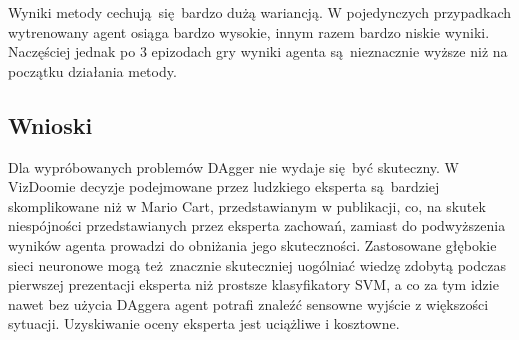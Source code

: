 Wyniki metody cechują się bardzo dużą wariancją. W pojedynczych przypadkach wytrenowany agent osiąga bardzo wysokie, innym razem bardzo niskie wyniki. Naczęściej jednak po 3 epizodach gry wyniki agenta są nieznacznie wyższe niż na początku działania metody.

\subsection{Wnioski}
Dla wypróbowanych problemów DAgger nie wydaje się być skuteczny. W VizDoomie decyzje podejmowane przez ludzkiego eksperta są bardziej skomplikowane niż w Mario Cart, przedstawianym w publikacji, co, na skutek niespójności przedstawianych przez eksperta zachowań, zamiast do podwyższenia wyników agenta prowadzi do obniżania jego skuteczności. Zastosowane głębokie sieci neuronowe mogą też znacznie skuteczniej uogólniać wiedzę zdobytą podczas pierwszej prezentacji eksperta niż prostsze klasyfikatory SVM, a co za tym idzie nawet bez użycia DAggera agent potrafi znaleźć sensowne wyjście z większości sytuacji. Uzyskiwanie oceny eksperta jest uciążliwe i kosztowne.

